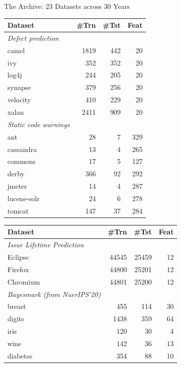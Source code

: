 \documentclass[10pt,aspectratio=169]{beamer}
\begin{document}
\begin{frame}{The Archive: 23 Datasets across 30 Years}
  \begin{minipage}[t]{0.4\textwidth}
\small
\begin{tabular}{lrrr}
\toprule
\textbf{Dataset} & \textbf{\#Trn} & \textbf{\#Tst} & \textbf{Feat} \\
\midrule
\textit{Defect prediction}  & & &  \\
camel    & 1819 & 442 & 20 \\
ivy      & 352  & 352 & 20 \\
log4j    & 244  & 205 & 20 \\
synapse  & 379  & 256 & 20 \\
velocity & 410  & 229 & 20 \\
xalan    & 2411 & 909 & 20 \\
\midrule
\textit{Static code warnings}  & & & \\
ant         & 28  & 7  & 329 \\
cassandra   & 13  & 4  & 265 \\
commons     & 17  & 5  & 127 \\
derby       & 366 & 92 & 292 \\
jmeter      & 14  & 4  & 287 \\
lucene-solr & 24  & 6  & 278 \\
tomcat      & 147 & 37 & 284 \\
\bottomrule
\end{tabular}
\end{minipage}
  \hspace{1cm}
  \begin{minipage}[t]{0.4\textwidth}
\small
\begin{tabular}{lrrr}
\toprule
\textbf{Dataset} & \textbf{\#Trn} & \textbf{\#Tst} & \textbf{Feat} \\
\midrule
\textit{Issue Lifetime Prediction }  & & &  \\
Eclipse  & 44545 & 25459 & 12 \\
Firefox  & 44800 & 25201 & 12 \\
Chromium & 44801 & 25200 & 12 \\
\midrule
  \textit{Bayesmark (from NuerIPS'20)} & & &  \\
breast   & 455  & 114 & 30 \\
digits   & 1438 & 359 & 64 \\
iris     & 120  & 30  & 4  \\
wine     & 142  & 36  & 13 \\
diabetes & 354  & 88  & 10 \\
\bottomrule
\end{tabular}
\end{minipage}
\end{frame}
\end{document}
